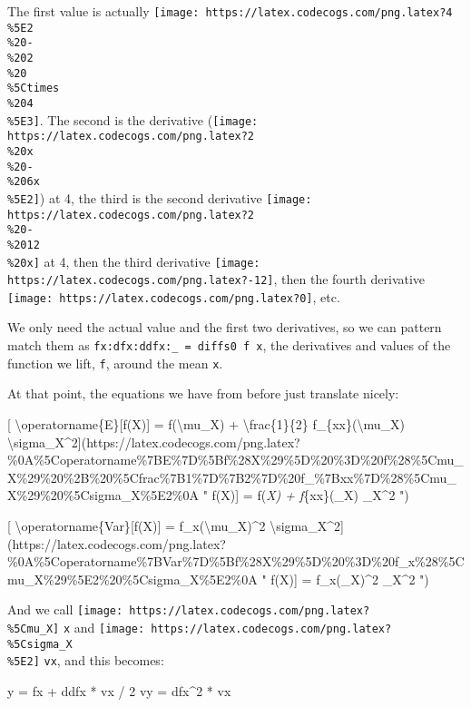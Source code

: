 \documentclass[]{article}
\newenvironment{Shaded}{}{}
\newcommand{\DecValTok}[1]{\textcolor[rgb]{0.25,0.63,0.44}{#1}}
\newcommand{\FunctionTok}[1]{\textcolor[rgb]{0.02,0.16,0.49}{#1}}
\newcommand{\NormalTok}[1]{#1}
\begin{document}
The first value is actually
\texttt{[image: https://latex.codecogs.com/png.latex?4\\\%5E2\\\%20-\\\%202\\\%20\\\%5Ctimes\\\%204\\\%5E3]}.
The second is the derivative
(\texttt{[image: https://latex.codecogs.com/png.latex?2\\\%20x\\\%20-\\\%206x\\\%5E2]})
at 4, the third is the second derivative
\texttt{[image: https://latex.codecogs.com/png.latex?2\\\%20-\\\%2012\\\%20x]} at 4,
then the third derivative
\texttt{[image: https://latex.codecogs.com/png.latex?-12]}, then the fourth
derivative \texttt{[image: https://latex.codecogs.com/png.latex?0]}, etc.

We only need the actual value and the first two derivatives, so we can pattern
match them as \texttt{fx:dfx:ddfx:\_\ =\ diffs0\ f\ x}, the derivatives and
values of the function we lift, \texttt{f}, around the mean \texttt{x}.

At that point, the equations we have from before just translate nicely:

{[} \textbackslash{}operatorname\{E\}{[}f(X){]} = f(\textbackslash{}mu\_X) +
\textbackslash{}frac\{1\}\{2\} f\_\{xx\}(\textbackslash{}mu\_X)
\textbackslash{}sigma\_X\^{}2{]}(https://latex.codecogs.com/png.latex?\%0A\%5Coperatorname\%7BE\%7D\%5Bf\%28X\%29\%5D\%20\%3D\%20f\%28\%5Cmu\_X\%29\%20\%2B\%20\%5Cfrac\%7B1\%7D\%7B2\%7D\%20f\_\%7Bxx\%7D\%28\%5Cmu\_X\%29\%20\%5Csigma\_X\%5E2\%0A
" \operatorname{E}{[}f(X){]} = f(\mu\emph{X) +  f}\{xx\}(\mu\_X)
\sigma\_X\^{}2 ")

{[} \textbackslash{}operatorname\{Var\}{[}f(X){]} =
f\_x(\textbackslash{}mu\_X)\^{}2
\textbackslash{}sigma\_X\^{}2{]}(https://latex.codecogs.com/png.latex?\%0A\%5Coperatorname\%7BVar\%7D\%5Bf\%28X\%29\%5D\%20\%3D\%20f\_x\%28\%5Cmu\_X\%29\%5E2\%20\%5Csigma\_X\%5E2\%0A
" \operatorname{Var}{[}f(X){]} = f\_x(\mu\_X)\^{}2 \sigma\_X\^{}2 ")

And we call \texttt{[image: https://latex.codecogs.com/png.latex?\\\%5Cmu\_X]}
\texttt{x} and
\texttt{[image: https://latex.codecogs.com/png.latex?\\\%5Csigma\_X\\\%5E2]}
\texttt{vx}, and this becomes:

\begin{Shaded}
\begin{Highlighting}[]
\NormalTok{y  }\FunctionTok{=}\NormalTok{ fx }\FunctionTok{+}\NormalTok{ ddfx }\FunctionTok{*}\NormalTok{ vx }\FunctionTok{/} \DecValTok{2}
\NormalTok{vy }\FunctionTok{=}\NormalTok{ dfx}\FunctionTok{^}\DecValTok{2} \FunctionTok{*}\NormalTok{ vx}
\end{Highlighting}
\end{Shaded}
\end{document}
